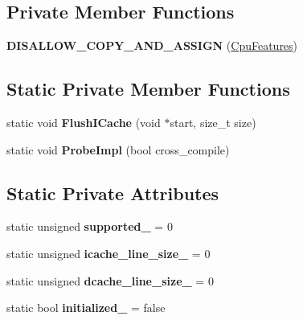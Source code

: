 \subsection*{Private Member Functions}
\begin{DoxyCompactItemize}
\item 
{\bfseries D\+I\+S\+A\+L\+L\+O\+W\+\_\+\+C\+O\+P\+Y\+\_\+\+A\+N\+D\+\_\+\+A\+S\+S\+I\+GN} (\hyperlink{classv8_1_1internal_1_1_cpu_features}{Cpu\+Features})\hypertarget{classv8_1_1internal_1_1_cpu_features_a8eb408daaaba78168c23d3e6f6dcafe5}{}\label{classv8_1_1internal_1_1_cpu_features_a8eb408daaaba78168c23d3e6f6dcafe5}

\end{DoxyCompactItemize}
\subsection*{Static Private Member Functions}
\begin{DoxyCompactItemize}
\item 
static void {\bfseries Flush\+I\+Cache} (void $\ast$start, size\+\_\+t size)\hypertarget{classv8_1_1internal_1_1_cpu_features_a3c49200d3b4432aee11586ed15cd49b7}{}\label{classv8_1_1internal_1_1_cpu_features_a3c49200d3b4432aee11586ed15cd49b7}

\item 
static void {\bfseries Probe\+Impl} (bool cross\+\_\+compile)\hypertarget{classv8_1_1internal_1_1_cpu_features_ac2625721875861a6f432123b75b6b846}{}\label{classv8_1_1internal_1_1_cpu_features_ac2625721875861a6f432123b75b6b846}

\end{DoxyCompactItemize}
\subsection*{Static Private Attributes}
\begin{DoxyCompactItemize}
\item 
static unsigned {\bfseries supported\+\_\+} = 0\hypertarget{classv8_1_1internal_1_1_cpu_features_a9208502ba124784127b46ae75eb39597}{}\label{classv8_1_1internal_1_1_cpu_features_a9208502ba124784127b46ae75eb39597}

\item 
static unsigned {\bfseries icache\+\_\+line\+\_\+size\+\_\+} = 0\hypertarget{classv8_1_1internal_1_1_cpu_features_a969bfb7b14676f419578f948e850355d}{}\label{classv8_1_1internal_1_1_cpu_features_a969bfb7b14676f419578f948e850355d}

\item 
static unsigned {\bfseries dcache\+\_\+line\+\_\+size\+\_\+} = 0\hypertarget{classv8_1_1internal_1_1_cpu_features_a998571e44624cd38f2d1d1f868fcea0b}{}\label{classv8_1_1internal_1_1_cpu_features_a998571e44624cd38f2d1d1f868fcea0b}

\item 
static bool {\bfseries initialized\+\_\+} = false\hypertarget{classv8_1_1internal_1_1_cpu_features_a3483d1fb0b62ee0ab2bc30583f55da2c}{}\label{classv8_1_1internal_1_1_cpu_features_a3483d1fb0b62ee0ab2bc30583f55da2c}

\end{DoxyCompactItemize}

